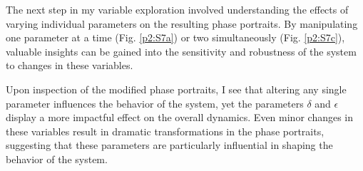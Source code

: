 The next step in my variable exploration involved understanding the effects of varying individual parameters on the resulting phase portraits. By manipulating one parameter at a time (Fig. \ref{p2:S7a}) or two simultaneously (Fig. \ref{p2:S7c}), valuable insights can be gained into the sensitivity and robustness of the system to changes in these variables.

Upon inspection of the modified phase portraits, I see that altering any single parameter influences the behavior of the system, yet the parameters $\delta$ and $\epsilon$ display a more impactful effect on the overall dynamics. Even minor changes in these variables result in dramatic transformations in the phase portraits, suggesting that these parameters are particularly influential in shaping the behavior of the system.


